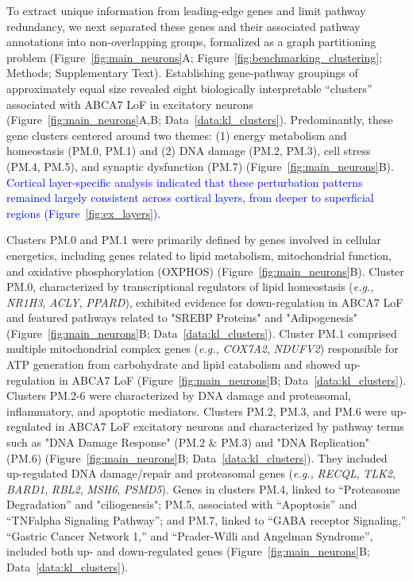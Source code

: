 To extract unique information from leading-edge genes and limit pathway redundancy, we next separated these genes and their associated pathway annotations into non-overlapping groups, formalized as a graph partitioning problem (Figure~\ref{fig:main_neurons}A; Figure~\ref{fig:benchmarking_clustering}; Methods; Supplementary Text). Establishing gene-pathway groupings of approximately equal size revealed eight biologically interpretable “clusters” associated with ABCA7 LoF in excitatory neurons (Figure~\ref{fig:main_neurons}A,B; Data~\ref{data:kl_clusters}). Predominantly, these gene clusters centered around two themes: (1) energy metabolism and homeostasis (PM.0, PM.1) and (2) DNA damage (PM.2, PM.3), cell stress (PM.4, PM.5), and synaptic dysfunction (PM.7) (Figure~\ref{fig:main_neurons}B). \newcommand{\quoteLayer}{\textcolor{blue}{Cortical layer-specific analysis indicated that these perturbation patterns remained largely consistent across cortical layers, from deeper to superficial regions (Figure~\ref{fig:ex_layers}).}\label{quoteLayer-label}}\quoteLayer

Clusters PM.0 and PM.1 were primarily defined by genes involved in cellular energetics, including genes related to lipid metabolism, mitochondrial function, and oxidative phosphorylation (OXPHOS) (Figure~\ref{fig:main_neurons}B). Cluster PM.0, characterized by transcriptional regulators of lipid homeostasis (\textit{e.g.,} \textit{NR1H3}, \textit{ACLY}, \textit{PPARD}), exhibited evidence for down-regulation in ABCA7 LoF and featured pathways related to "SREBP Proteins" and "Adipogenesis" (Figure~\ref{fig:main_neurons}B; Data~\ref{data:kl_clusters}). Cluster PM.1 comprised multiple mitochondrial complex genes (\textit{e.g.,} \textit{COX7A2}, \textit{NDUFV2}) responsible for ATP generation from carbohydrate and lipid catabolism and showed up-regulation in ABCA7 LoF (Figure~\ref{fig:main_neurons}B; Data~\ref{data:kl_clusters}). Clusters PM.2-6 were characterized by DNA damage and proteasomal, inflammatory, and apoptotic mediators. Clusters PM.2, PM.3, and PM.6 were up-regulated in ABCA7 LoF excitatory neurons and characterized by pathway terms such as "DNA Damage Response" (PM.2 \& PM.3) and "DNA Replication" (PM.6) (Figure~\ref{fig:main_neurons}B; Data~\ref{data:kl_clusters}). They included up-regulated DNA damage/repair and proteasomal genes (\textit{e.g.,} \textit{RECQL}, \textit{TLK2}, \textit{BARD1}, \textit{RBL2}, \textit{MSH6}, \textit{PSMD5}). Genes in clusters PM.4, linked to “Proteasome Degradation” and "ciliogenesis"; PM.5, associated with “Apoptosis” and “TNFalpha Signaling Pathway”; and PM.7, linked to “GABA receptor Signaling,” “Gastric Cancer Network 1,” and “Prader-Willi and Angelman Syndrome”, included both up- and down-regulated genes (Figure~\ref{fig:main_neurons}B; Data~\ref{data:kl_clusters}).

